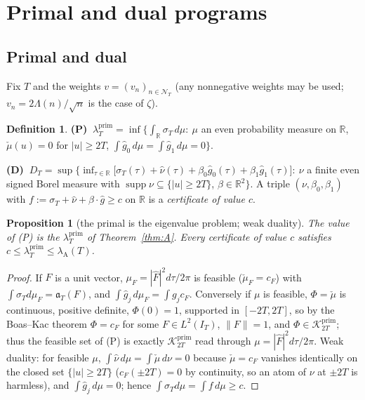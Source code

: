 \documentclass[11pt]{amsart}
\newtheorem{proposition}[theorem]{Proposition}
\theoremstyle{definition}
\newtheorem{definition}[theorem]{Definition}
\theoremstyle{remark}
\newcommand{\R}{\mathbb R}
\newcommand{\supp}{\operatorname{supp}}
\newcommand{\Kp}{\mathcal K^{\mathrm{prim}}_{2T}}
\newcommand{\IT}{I_T}
\newcommand{\lamP}{\lambda^{\mathrm{prim}}_T}
\newcommand{\lamA}{\lambda_{\mathrm A}(T)}
\newcommand{\sT}{\sigma_T}
\newcommand{\gh}[1]{\widehat g_{#1}}
\newcommand{\nuh}{\widehat\nu}
\newcommand{\Fh}{\widehat F}
\newcommand{\cF}{c_F}
\newcommand{\NT}{\mathcal N_T}
\begin{document}
\section{Primal and dual programs}\label{sec:duality}

\subsection{Primal and dual}
Fix $T$ and the weights $v=(v_n)_{n\in\NT}$ (any nonnegative weights may be used; $v_n=2\Lambda(n)/\sqrt n$
is the case of $\zeta$).

\begin{definition}\label{def:PD}
\textbf{(P)} $\ \lamP=\inf\big\{\int_\R\sT\,d\mu:\ \mu$ an even probability measure on $\R$,
$\check\mu(u)=0$ for $|u|\ge2T$, $\int\gh0\,d\mu=\int\gh1\,d\mu=0\big\}$.

\textbf{(D)} $\ D_T=\sup\big\{\inf_{\tau\in\R}\big[\sT(\tau)+\nuh(\tau)+\beta_0\gh0(\tau)+\beta_1\gh1(\tau)\big]:\
\nu$ a finite even signed Borel measure with $\supp\nu\subseteq\{|u|\ge2T\}$, $\beta\in\R^2\big\}$.
A triple $(\nu,\beta_0,\beta_1)$ with $f:=\sT+\nuh+\beta\cdot\widehat g\ge c$ on $\R$ is a
\emph{certificate of value $c$}.
\end{definition}

\begin{proposition}[the primal is the eigenvalue problem; weak duality]\label{prop:weak}
The value of \textup{(P)} is the $\lamP$ of Theorem~\ref{thm:A}. Every certificate of value $c$
satisfies $c\le\lamP\le\lamA$.
\end{proposition}
\begin{proof}
If $F$ is a unit vector, $\mu_F=|\Fh|^2d\tau/2\pi$ is feasible ($\check\mu_F=\cF$) with
$\int\sT d\mu_F=\mathfrak a_T(F)$, and $\int\gh j\,d\mu_F=\int g_j\cF$. Conversely if $\mu$ is
feasible, $\Phi=\check\mu$ is continuous, positive definite, $\Phi(0)=1$, supported in $[-2T,2T]$,
so by the Boas--Kac theorem \cite{BoasKac1945} $\Phi=\cF$ for some $F\in L^2(\IT)$, $\|F\|=1$, and
$\Phi\in\Kp$; thus the feasible set of (P) is exactly $\Kp$ read through $\mu=|\Fh|^2d\tau/2\pi$.
Weak duality: for feasible $\mu$, $\int\nuh\,d\mu=\int\check\mu\,d\nu=0$ because $\check\mu=\cF$
vanishes identically on the closed set $\{|u|\ge2T\}$ ($\cF(\pm2T)=0$ by continuity, so an atom
of $\nu$ at $\pm2T$ is harmless), and $\int\gh j\,d\mu=0$; hence
$\int\sT d\mu=\int f\,d\mu\ge c$.
\end{proof}
\end{document}
